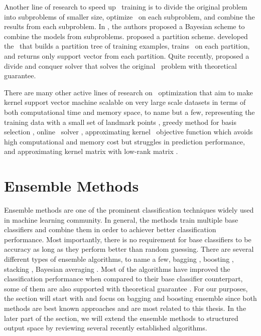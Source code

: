 {Another line of research to speed up \svm\ training is to divide the original problem into subproblems of smaller size, optimize \svm\ on each subproblem, and combine the results from each subproblem.
In \citep{Tresp00a,Schwaighofer01the}, the authors proposed a Bayesian scheme to combine the models from subproblems.
\citet{Collobert02a} proposed a partition scheme.
\citet{Graf05parallel} developed the \svmcascade\ that builds a partition tree of training examples, trains \svm\ on each partition, and returns only support vector from each partition.
Quite recently, \citet{Hsieh14a} proposed a divide and conquer solver that solves the original \svm\ problem with theoretical guarantee.

There are many other active lines of research on \svm\ optimization that aim to make kernel support vector machine scalable on very large scale datasets in terms of both computational time and memory space, to name but a few, representing the training data with a small set of landmark points \citep{Pavlov00towards,Boley04training,Yu05making,Zhang08improved}, greedy method for basis selection \citep{Keerthi06building}, online \svm\ solver \citep{Bordes05fast}, approximating kernel \svm\ objective function \citep{Zhang12scaling, Le13fast} which avoids high computational and memory cost but struggles in prediction performance, and approximating kernel matrix with low-rank matrix \citep{Smola00sparse,Fine02efficient,Drineas05on,Si14memory}.



%
%
%
\section{Ensemble Methods} \label{sc_em}

Ensemble methods are one of the prominent classification techniques widely used in machine learning community.
In general, the methods train multiple base classifiers and combine them in order to achiever better classification performance.
Most importantly, there is no requirement for base classifiers to be accuracy as long as they perform better than random guessing.
There are several different types of ensemble algorithms, to name a few, bagging \citep{Breiman96bagging}, boosting \citep{Freund97a,Schapire99improved}, stacking \citep{Smyth99linearly}, Bayesian averaging \citep{Freund04generalization}.
Most of the algorithms have improved the classification performance when compared to their base classifier counterpart, some of them are also supported with theoretical guarantee \citep{Schapire97boosting,Koltchinskii00empirical,Cortes14semble,Cortes14deep}.
For our purposes, the section will start with and focus on bagging and boosting ensemble since both methods are best known approaches and are most related to this thesis.
In the later part of the section, we will extend the ensemble methods to structured output space by reviewing several recently established algorithms.


}
